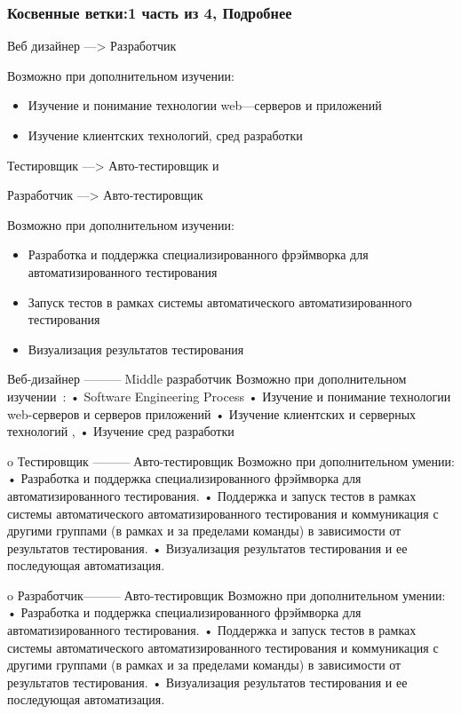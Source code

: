 \documentclass{../industrial-development}
\begin{document}
{\begin{frame} \frametitle{Косвенные ветки:1 часть из 4, Подробнее}

\begin{block}{Веб дизайнер ---> Разработчик}

Возможно при дополнительном изучении:
  \end{block}
\begin{itemize}
  \item Изучение и понимание технологии web---серверов и приложений
  \item Изучение клиентских технологий, сред разработки
  \end{itemize}

 \begin{block}{Тестировщик ---> Авто-тестировщик        и 

Разработчик ---> Авто-тестировщик }

Возможно при дополнительном изучении:
  \end{block}
\begin{itemize}
  \item Разработка и поддержка специализированного фрэймворка для автоматизированного тестирования
  \item Запуск тестов в рамках системы автоматического автоматизированного тестирования
\item Визуализация результатов тестирования
  \end{itemize}
\end{frame}

\lecturenotes

Веб-дизайнер ---------Middle разработчик
Возможно при дополнительном изучении~\cite{rab}:
•	Software Engineering Process
•	 Изучение и понимание технологии web-серверов и серверов приложений
•	Изучение клиентских и серверных технологий , 
•	Изучение сред разработки


o	Тестировщик ---------Авто-тестировщик
Возможно при дополнительном умении:
•	Разработка и поддержка специализированного фрэймворка для автоматизированного тестирования.
•	Поддержка и запуск тестов в рамках системы автоматического автоматизированного тестирования и коммуникация с другими группами (в рамках и за пределами команды) в зависимости от результатов тестирования.
•	Визуализация результатов тестирования и ее последующая автоматизация.


o	Разработчик---------Авто-тестировщик
Возможно при дополнительном умении:
•	Разработка и поддержка специализированного фрэймворка для автоматизированного тестирования.
•	Поддержка и запуск тестов в рамках системы автоматического автоматизированного тестирования и коммуникация с другими группами (в рамках и за пределами команды) в зависимости от результатов тестирования.
•	Визуализация результатов тестирования и ее последующая автоматизация.


}
\end{document}
